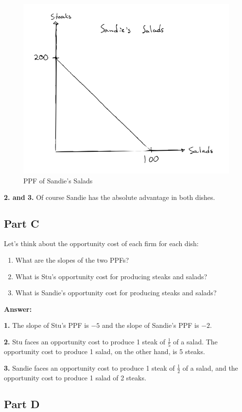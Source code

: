 \documentclass[12pt]{article}
\begin{document}
\begin{figure}
    \centering
    \includegraphics[width=.6\textwidth]{sandiePPF.png}
    \caption{PPF of Sandie's Salads}
    \label{fig:sandiePPF}
\end{figure}

\textbf{2. and 3.} Of course Sandie has the absolute advantage in both dishes.

\subsection*{Part C}
Let's think about the opportunity cost of each firm for each dish:
\begin{enumerate}
    \item What are the slopes of the two PPFs?
    \item What is Stu's opportunity cost for producing steaks and salads?
    \item What is Sandie's opportunity cost for producing steaks and salads?
\end{enumerate}

\textbf{Answer:}

\textbf{1.} The slope of Stu's PPF is $-5$ and the slope of Sandie's PPF is $-2$.

\textbf{2.} Stu faces an opportunity cost to produce 1 steak of $\frac{1}{5}$ of a salad. The opportunity cost to produce 1 salad, on the other hand, is 5 steaks.

\textbf{3.} Sandie faces an opportunity cost to produce 1 steak of $\frac{1}{2}$ of a salad, and the opportunity cost to produce 1 salad of 2 steaks.

\medskip

\subsection*{Part D}
\end{document}
